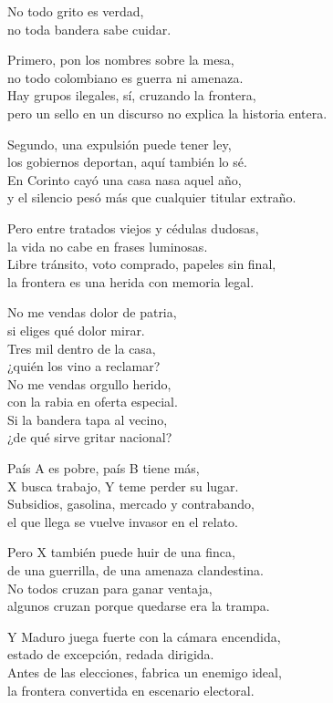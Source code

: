 \begin{lyrics}
No todo grito es verdad,\\
no toda bandera sabe cuidar.

Primero, pon los nombres sobre la mesa,\\
no todo colombiano es guerra ni amenaza.\\
Hay grupos ilegales, sí, cruzando la frontera,\\
pero un sello en un discurso no explica la historia entera.

Segundo, una expulsión puede tener ley,\\
los gobiernos deportan, aquí también lo sé.\\
En Corinto cayó una casa nasa aquel año,\\
y el silencio pesó más que cualquier titular extraño.

Pero entre tratados viejos y cédulas dudosas,\\
la vida no cabe en frases luminosas.\\
Libre tránsito, voto comprado, papeles sin final,\\
la frontera es una herida con memoria legal.

No me vendas dolor de patria,\\
si eliges qué dolor mirar.\\
Tres mil dentro de la casa,\\
¿quién los vino a reclamar?\\
No me vendas orgullo herido,\\
con la rabia en oferta especial.\\
Si la bandera tapa al vecino,\\
¿de qué sirve gritar nacional?

País A es pobre, país B tiene más,\\
X busca trabajo, Y teme perder su lugar.\\
Subsidios, gasolina, mercado y contrabando,\\
el que llega se vuelve invasor en el relato.

Pero X también puede huir de una finca,\\
de una guerrilla, de una amenaza clandestina.\\
No todos cruzan para ganar ventaja,\\
algunos cruzan porque quedarse era la trampa.

Y Maduro juega fuerte con la cámara encendida,\\
estado de excepción, redada dirigida.\\
Antes de las elecciones, fabrica un enemigo ideal,\\
la frontera convertida en escenario electoral.


\end{lyrics}
